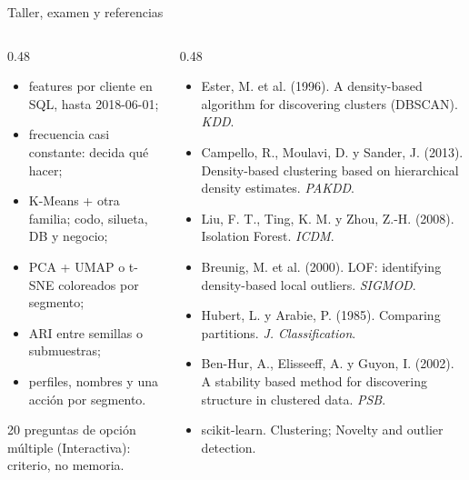 \documentclass[aspectratio=169,12pt]{beamer}
\begin{document}
\begin{frame}{Taller, examen y referencias}
  \begin{columns}[T]
    \begin{column}{0.48\textwidth}
      \begin{taskbox}
        \scriptsize
        \begin{itemize}
          \item features por cliente en SQL, hasta 2018-06-01;
          \item frecuencia casi constante: decida qué hacer;
          \item K-Means + otra familia; codo, silueta, DB y negocio;
          \item PCA + UMAP o t-SNE coloreados por segmento;
          \item ARI entre semillas o submuestras;
          \item perfiles, nombres y una acción por segmento.
        \end{itemize}
      \end{taskbox}
      \begin{keybox}
        \scriptsize 20 preguntas de opción múltiple (Interactiva): criterio, no memoria.
      \end{keybox}
    \end{column}
    \begin{column}{0.48\textwidth}
      \scriptsize
      \begin{itemize}
        \item Ester, M. et al. (1996). A density-based algorithm for discovering clusters (DBSCAN). \emph{KDD}.
        \item Campello, R., Moulavi, D. y Sander, J. (2013). Density-based clustering based on hierarchical density estimates. \emph{PAKDD}.
        \item Liu, F. T., Ting, K. M. y Zhou, Z.-H. (2008). Isolation Forest. \emph{ICDM}.
        \item Breunig, M. et al. (2000). LOF: identifying density-based local outliers. \emph{SIGMOD}.
        \item Hubert, L. y Arabie, P. (1985). Comparing partitions. \emph{J. Classification}.
        \item Ben-Hur, A., Elisseeff, A. y Guyon, I. (2002). A stability based method for discovering structure in clustered data. \emph{PSB}.
        \item scikit-learn. Clustering; Novelty and outlier detection.
      \end{itemize}
    \end{column}
  \end{columns}
\end{frame}
\end{document}
